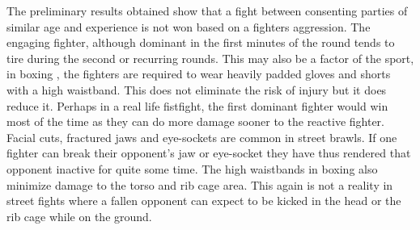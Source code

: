 \documentclass{article}
\begin{document}
The preliminary results obtained show that a fight between consenting parties of similar age and experience is not won based on a fighters aggression. The engaging fighter, although dominant in the first minutes of the round tends to tire during the second or recurring rounds. This may also be a factor of the sport, in boxing , the fighters are required to wear heavily padded gloves and shorts with a high waistband. This does not eliminate the risk of injury but it does reduce it. Perhaps in a real life fistfight, the first dominant fighter would win most of the time as they can do more damage sooner to the reactive fighter.\cite{three} Facial cuts, fractured jaws and eye-sockets are common in street brawls. If one fighter can break their opponent's jaw or eye-socket they have thus rendered that opponent inactive for quite some time.\cite{four} The high waistbands in boxing also minimize damage to the torso and rib cage area. This again is not a reality in street fights where a fallen opponent can expect to be kicked in the head or the rib cage while on the ground.\\
\end{document}
